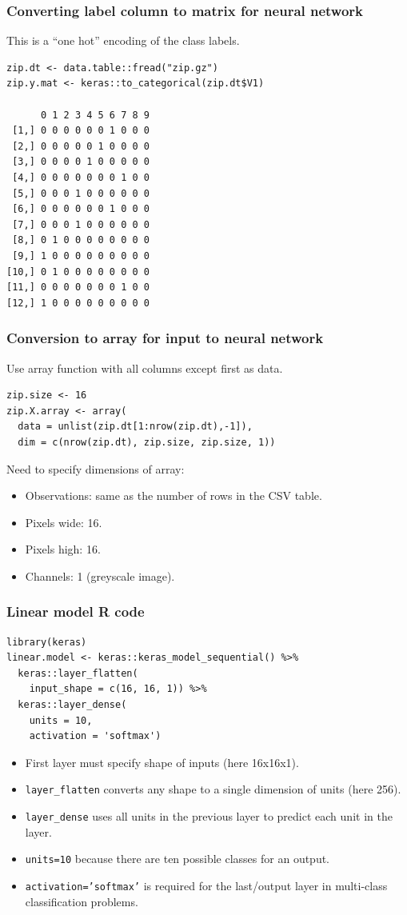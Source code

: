 \documentclass{beamer}
\begin{document}
\begin{frame}[fragile]
  \frametitle{Converting label column to matrix for neural network}

  This is a ``one hot'' encoding of the class labels.
  
\begin{verbatim}
zip.dt <- data.table::fread("zip.gz")
zip.y.mat <- keras::to_categorical(zip.dt$V1)

      0 1 2 3 4 5 6 7 8 9
 [1,] 0 0 0 0 0 0 1 0 0 0
 [2,] 0 0 0 0 0 1 0 0 0 0
 [3,] 0 0 0 0 1 0 0 0 0 0
 [4,] 0 0 0 0 0 0 0 1 0 0
 [5,] 0 0 0 1 0 0 0 0 0 0
 [6,] 0 0 0 0 0 0 1 0 0 0
 [7,] 0 0 0 1 0 0 0 0 0 0
 [8,] 0 1 0 0 0 0 0 0 0 0
 [9,] 1 0 0 0 0 0 0 0 0 0
[10,] 0 1 0 0 0 0 0 0 0 0
[11,] 0 0 0 0 0 0 0 1 0 0
[12,] 1 0 0 0 0 0 0 0 0 0
\end{verbatim}


\end{frame}

\begin{frame}[fragile]
  \frametitle{Conversion to array for input to neural network}
Use array function with all columns except first as data.  
\begin{verbatim}
zip.size <- 16
zip.X.array <- array(
  data = unlist(zip.dt[1:nrow(zip.dt),-1]),
  dim = c(nrow(zip.dt), zip.size, zip.size, 1))
\end{verbatim}
Need to specify dimensions of array:
\begin{itemize}
\item Observations: same as the number of rows in the CSV table.
\item Pixels wide: 16.
\item Pixels high: 16.
\item Channels: 1 (greyscale image).
\end{itemize}

\end{frame}

\begin{frame}[fragile]
  \frametitle{Linear model R code}

\begin{verbatim}
library(keras)
linear.model <- keras::keras_model_sequential() %>%
  keras::layer_flatten(
    input_shape = c(16, 16, 1)) %>%
  keras::layer_dense(
    units = 10,
    activation = 'softmax')
\end{verbatim}

  \begin{itemize}
  \item First layer must specify shape of inputs (here 16x16x1).
  \item \texttt{layer\_flatten} converts any shape to a single dimension
    of units (here 256).
  \item \texttt{layer\_dense} uses all units in the previous layer to
    predict each unit in the layer.
  \item \texttt{units=10} because there are ten possible classes for an output.
  \item \texttt{activation='softmax'} is required for the last/output layer in
    multi-class classification problems.
  \end{itemize}

\end{frame}
\end{document}
